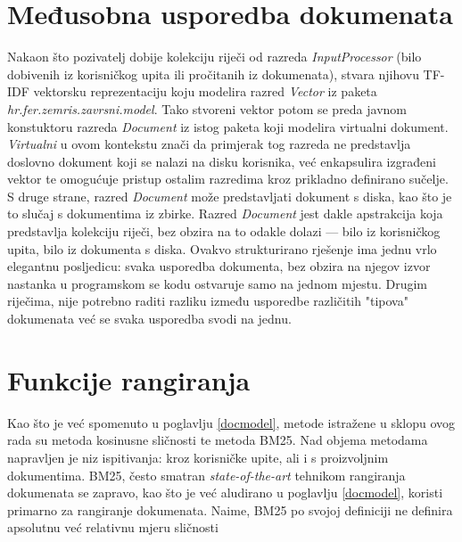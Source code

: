 \documentclass[times, utf8, zavrsni]{fer}
\begin{document}
\section{Međusobna usporedba dokumenata}
Nakaon što pozivatelj dobije kolekciju riječi od razreda \textit{InputProcessor} (bilo dobivenih iz korisničkog upita ili pročitanih iz dokumenata), stvara njihovu TF-IDF vektorsku reprezentaciju koju modelira razred \textit{Vector} iz paketa \textit{hr.fer.zemris.zavrsni.model}. Tako stvoreni vektor potom se preda javnom konstuktoru razreda \textit{Document} iz istog paketa koji modelira virtualni dokument. \textit{Virtualni} u ovom kontekstu znači da primjerak tog razreda ne predstavlja doslovno dokument koji se nalazi na disku korisnika, već enkapsulira izgrađeni vektor te omogućuje pristup ostalim razredima kroz prikladno definirano sučelje. S druge strane, razred \textit{Document} može predstavljati dokument s diska, kao što je to slučaj s dokumentima iz zbirke. Razred \textit{Document} jest dakle apstrakcija koja predstavlja kolekciju riječi, bez obzira na to odakle dolazi — bilo iz korisničkog upita, bilo iz dokumenta s diska. Ovakvo strukturirano rješenje ima jednu vrlo elegantnu posljedicu: svaka usporedba dokumenta, bez obzira na njegov izvor nastanka u programskom se kodu ostvaruje samo na jednom mjestu. Drugim riječima, nije potrebno raditi razliku između usporedbe različitih "tipova" dokumenata već se svaka usporedba svodi na jednu.

\section{Funkcije rangiranja}
Kao što je već spomenuto u poglavlju \ref{docmodel}, metode istražene u sklopu ovog rada su metoda kosinusne sličnosti te metoda BM25.
Nad objema metodama napravljen je niz ispitivanja: kroz korisničke upite, ali i s proizvoljnim dokumentima. BM25, često smatran \textit{state-of-the-art} tehnikom rangiranja dokumenata se zapravo, kao što je već aludirano u poglavlju \ref{docmodel}, koristi primarno za rangiranje dokumenata. Naime, BM25 po svojoj definiciji ne definira apsolutnu već relativnu mjeru sličnosti
\end{document}

